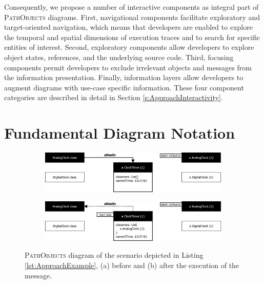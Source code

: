 Consequently, we propose a number of interactive components as integral part of \textsc{PathObjects} diagrams.
First, navigational components facilitate exploratory and target-oriented navigation, which means that developers are enabled to explore the temporal and spatial dimensions of execution traces and to search for specific entities of interest.
Second, exploratory components allow developers to explore object states, references, and the underlying source code.
Third, focusing components permit developers to exclude irrelevant objects and messages from the information presentation. 
Finally, information layers allow developers to augment diagrams with use-case specific information.
These four component categories are described in detail in Section \ref{s:ApproachInteractivity}.

\section[Fundamental Diagram Notation]{Fundamental Diagram Notation%
}
\label{s:ApproachNotation}

\begin{figure}[tb]
	\centering
	
	\begin{subfigure}[b]{1.0\textwidth}
		\centering
        \includegraphics[width=\textwidth]{../images/03-PathObjects-Before}
        \caption[Before the Execution of the Current Message]{}
		\label{fig:ApproachBasicBefore}
	\end{subfigure}
	
	\vspace{1.0cm}
	
	\begin{subfigure}[b]{1.0\textwidth}
		\centering
		\includegraphics[width=\textwidth]{../images/03-PathObjects-After}
		\caption[After the Execution of the Current Message]{}
		\label{fig:ApproachBasicAfter}
	\end{subfigure}
	
	\caption[Exemplary \textsc{PathObjects} Diagram]{\textsc{PathObjects} diagram of the scenario depicted in Listing \ref{lst:ApproachExample}, (a) before and (b) after the execution of the  message.}
	\label{fig:ApproachBasic}
\end{figure}

